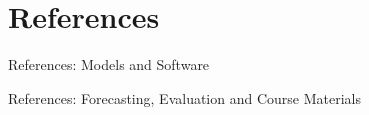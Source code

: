 \documentclass[aspectratio=169,11pt]{beamer}
\begin{document}
\section{References}
\nocite{*}
\renewcommand*{\bibfont}{\fontsize{8.5}{10.2}\selectfont}
\setlength{\bibitemsep}{2pt}

\begin{frame}{References: Models and Software}
  \printbibliography[heading=none,category=models]
\end{frame}

\begin{frame}{References: Forecasting, Evaluation and Course Materials}
  \printbibliography[heading=none,category=evaluation]
\end{frame}
\end{document}
